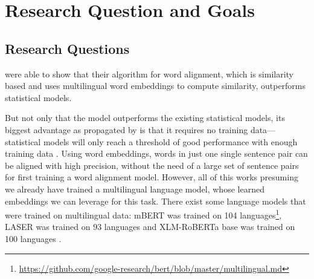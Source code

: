 


\section{Research Question and Goals}
\subsection{Research Questions}
\cite{jalili-sabet-etal-2020-simalign} were able to show that their algorithm for word alignment, which is similarity based and uses multilingual word embeddings to compute similarity, outperforms statistical models. 

But not only that the model outperforms the existing statistical models, its biggest advantage as propagated by \cite{jalili-sabet-etal-2020-simalign} is that it requires no training data--- 
statistical models will only reach a threshold of good performance with enough training data \autocites{jalili-sabet-etal-2020-simalign,och-ney-2000-improved}. 
Using word embeddings, words in just one single sentence pair can be aligned with high precision, without the need of a large set of sentence pairs for first training a word alignment model.
However, all of this works presuming we already have trained a multilingual language model, whose learned embeddings we can leverage for this task. 
There exist some language models that were trained on multilingual data: 
mBERT was trained on 104 languages\footnote{\url{https://github.com/google-research/bert/blob/master/multilingual.md}}, LASER was trained on 93 languages \autocite{artexte-schwenk-2019-laser} and XLM-RoBERTa base was trained on 100 languages \autocite{conneau-etal-2020-xlm}. 


